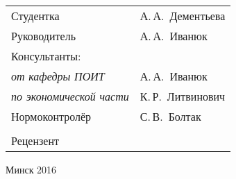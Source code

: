 \begin{titlepage}
\begin{center}
    \begin{tabular}{ p{}p{} }
      Студентка & А.\,А.~Дементьева \\
      Руководитель & А.\,А.~Иванюк \\
      Консультанты: &\\
      \hspace*{3ex}\emph{от кафедры ПОИТ} & А.\,А.~Иванюк \\
      \hspace*{3ex}\emph{по экономической части} & К.\,Р.~Литвинович \\
      Нормоконтролёр & С.\,В.~Болтак \\
      & \\
      Рецензент &
    \end{tabular}
    
    \vfill
    {\normalsize Минск 2016}
  \end{center}
\end{titlepage}
